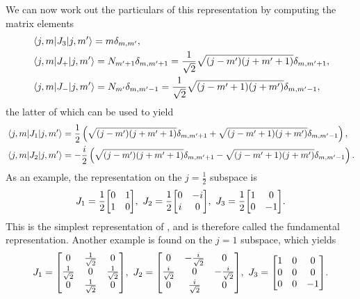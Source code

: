 We can now work out the particulars of this representation by computing the matrix elements
\begin{align*}
	&\mel{j, m}{J_{3}}{j, m\ensuremath{^{\prime}}} = m\delta_{m, m^{\prime}}, \\
	&\mel{j, m}{J_{+}}{j, m\ensuremath{^{\prime}}} = N_{m^{\prime} + 1}\delta_{m, m^{\prime} + 1} = \frac{1}{\sqrt{2}}\sqrt{(j - m^{\prime})(j + m^{\prime} + 1)}\delta_{m, m^{\prime} + 1}, \\
	&\mel{j, m}{J_{-}}{j, m\ensuremath{^{\prime}}} = N_{m^{\prime}}\delta_{m, m^{\prime} - 1} = \frac{1}{\sqrt{2}}\sqrt{(j - m^{\prime} + 1)(j + m^{\prime})}\delta_{m, m^{\prime} - 1},
\end{align*}
the latter of which can be used to yield
\begin{align*}
	&\mel{j, m}{J_{1}}{j, m\ensuremath{^{\prime}}} = \frac{1}{2}\left(\sqrt{(j - m^{\prime})(j + m^{\prime} + 1)}\delta_{m, m^{\prime} + 1} + \sqrt{(j - m^{\prime} + 1)(j + m^{\prime})}\delta_{m, m^{\prime} - 1}\right), \\
	&\mel{j, m}{J_{2}}{j, m\ensuremath{^{\prime}}} = -\frac{i}{2}\left(\sqrt{(j - m^{\prime})(j + m^{\prime} + 1)}\delta_{m, m^{\prime} + 1} - \sqrt{(j - m^{\prime} + 1)(j + m^{\prime})}\delta_{m, m^{\prime} - 1}\right).
\end{align*}
As an example, the representation on the $j = \frac{1}{2}$ subspace is
\begin{align*}
	J_{1} = \frac{1}{2}\mqty[
		0 & 1 \\
		1 & 0
	],\ J_{2} = \frac{1}{2}\mqty[
		0 & -i \\
		i & 0
	],\ J_{3} = \frac{1}{2}\mqty[
		1 & 0 \\
		0 & -1
	].
\end{align*}
This is the simplest representation of , and is therefore called the fundamental representation. Another example is found on the $j = 1$ subspace, which yields
\begin{align*}
	J_{1} = \mqty[
		0                  & \frac{1}{\sqrt{2}} & 0 \\
		\frac{1}{\sqrt{2}} & 0                  & \frac{1}{\sqrt{2}} \\
		0                  & \frac{1}{\sqrt{2}} & 0
	],\ J_{2} = \mqty[
		0                  & -\frac{i}{\sqrt{2}} & 0 \\
		\frac{i}{\sqrt{2}} & 0                   & -\frac{i}{\sqrt{2}} \\
		0                  & \frac{i}{\sqrt{2}}  & 0
	],\ J_{3} = \mqty[
		1 & 0 & 0 \\
		0 & 0 & 0 \\
		0 & 0 & -1
	].
\end{align*}

